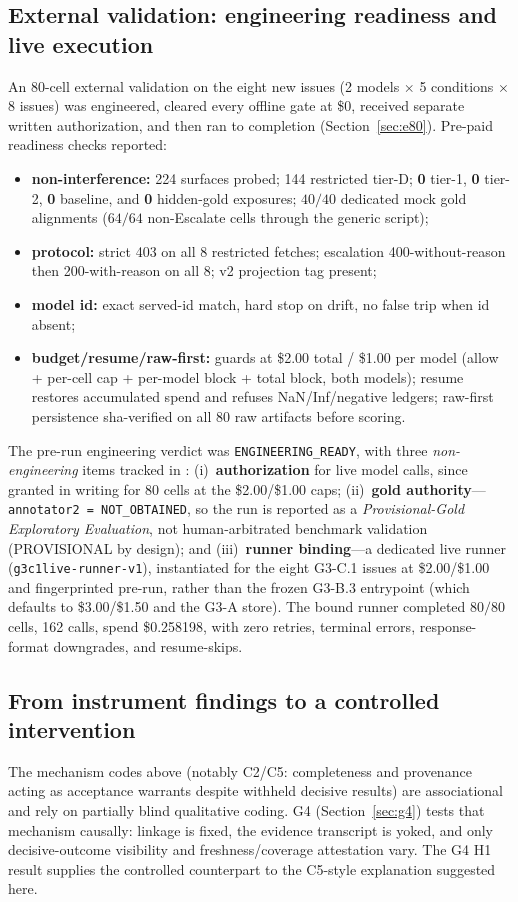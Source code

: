 \subsection{External validation: engineering readiness and live execution}
\label{sec:validation}
An 80-cell external validation on the eight new issues (2 models $\times$
5 conditions $\times$ 8 issues) was engineered, cleared every offline gate at
\$0, received separate written authorization, and then ran to completion
(Section~\ref{sec:e80}). Pre-paid readiness checks reported:
\begin{itemize}[leftmargin=1.6em,itemsep=1pt,topsep=2pt]
  \item \textbf{non-interference:} 224 surfaces probed; 144 restricted
  tier-D; \textbf{0} tier-1, \textbf{0} tier-2, \textbf{0} baseline, and
  \textbf{0} hidden-gold exposures; $40/40$ dedicated mock gold alignments
  ($64/64$ non-Escalate cells through the generic script);
  \item \textbf{protocol:} strict 403 on all 8 restricted fetches; escalation
  400-without-reason then 200-with-reason on all 8; v2 projection tag present;
  \item \textbf{model id:} exact served-id match, hard stop on drift, no false
  trip when id absent;
  \item \textbf{budget/resume/raw-first:} guards at \$2.00 total / \$1.00 per
  model (allow + per-cell cap + per-model block + total block, both models);
  resume restores accumulated spend and refuses NaN/Inf/negative ledgers;
  raw-first persistence sha-verified on all 80 raw artifacts before scoring.
\end{itemize}
The pre-run engineering verdict was \texttt{ENGINEERING\_READY}, with three
\emph{non-engineering} items tracked in
: (i)~\textbf{authorization}
for live model calls, since granted in writing for 80 cells at the
\$2.00/\$1.00 caps; (ii)~\textbf{gold authority}---\texttt{annotator2 =
NOT\_OBTAINED}, so the run is reported as a \emph{Provisional-Gold Exploratory
Evaluation}, not human-arbitrated benchmark validation (PROVISIONAL by
design); and (iii)~\textbf{runner binding}---a dedicated live runner
(\texttt{g3c1live-runner-v1}), instantiated for the eight G3-C.1 issues at
\$2.00/\$1.00 and fingerprinted pre-run, rather than the frozen G3-B.3
entrypoint (which defaults to \$3.00/\$1.50 and the G3-A store). The bound
runner completed $80/80$ cells, 162 calls, spend \$0.258198, with zero
retries, terminal errors, response-format downgrades, and resume-skips.

\subsection{From instrument findings to a controlled intervention}
The mechanism codes above (notably C2/C5: completeness and provenance acting
as acceptance warrants despite withheld decisive results) are associational
and rely on partially blind qualitative coding. G4
(Section~\ref{sec:g4}) tests that mechanism causally: linkage is fixed, the
evidence transcript is yoked, and only decisive-outcome visibility and
freshness/coverage attestation vary. The G4 H1 result supplies the
controlled counterpart to the C5-style explanation suggested here.
